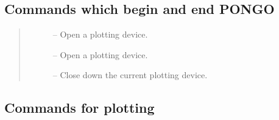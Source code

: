 \subsection{Commands which begin and end PONGO}

\small
\begin {quote}
  \begin {description}
  \item [] -- Open a plotting device.
  \item [] -- Open a plotting device.
  \item [] -- Close down the current plotting device.
  \end {description}
\end {quote}
\normalsize


\subsection{Commands for plotting}


